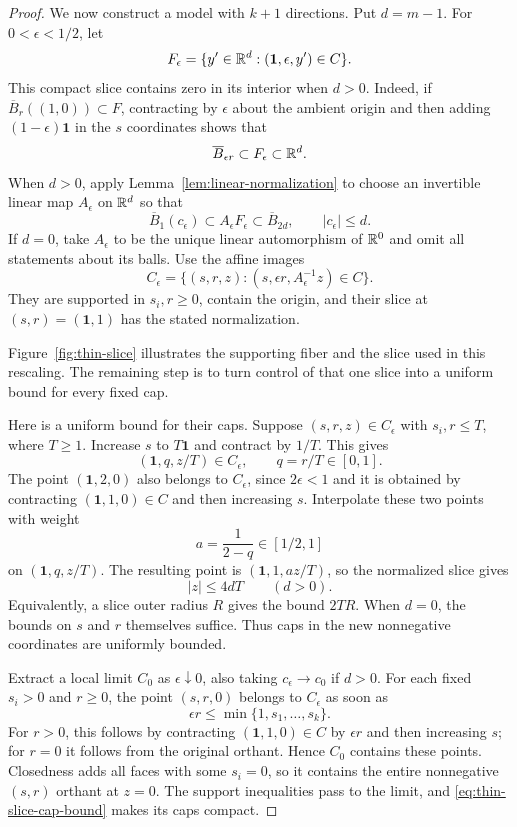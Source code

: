 \begin{proof}
We now construct a model with $k+1$ directions.  Put $d=m-1$.
For $0<\epsilon<1/2$, let
\[
 F_\epsilon=
 \{y'\in\mathbb R^d:(\mathbf1,\epsilon,y')\in C\}.
\]
This compact slice contains zero in its interior when $d>0$.
Indeed, if $\overline B_r((1,0))\subset F$, contracting by
$\epsilon$ about the ambient origin and then adding
$(1-\epsilon)\mathbf1$ in the $s$ coordinates shows that
\[
 \overline B_{\epsilon r}\subset F_\epsilon\subset\mathbb R^d.
\]
When $d>0$, apply Lemma~\ref{lem:linear-normalization} to choose an invertible
linear map $A_\epsilon$ on $\mathbb R^d$ so that
\[
 \overline B_1(c_\epsilon)\subset A_\epsilon F_\epsilon
 \subset\overline B_{2d},\qquad |c_\epsilon|\le d.
\]
If $d=0$, take $A_\epsilon$ to be the unique linear automorphism of
$\mathbb R^0$ and omit all statements about its balls.
Use the affine images
\[
 C_\epsilon=
 \{(s,r,z):(s,\epsilon r,A_\epsilon^{-1}z)\in C\}.
\]
They are supported in $s_i,r\ge0$, contain the origin, and their
slice at $(s,r)=(\mathbf1,1)$ has the stated normalization.

Figure~\ref{fig:thin-slice} illustrates the supporting fiber and the
slice used in this rescaling. The remaining step is to turn control of
that one slice into a uniform bound for every fixed cap.


Here is a uniform bound for their caps.  Suppose
$(s,r,z)\in C_\epsilon$ with $s_i,r\le T$, where $T\ge1$.
Increase $s$ to $T\mathbf1$ and contract by $1/T$.  This gives
\[
 (\mathbf1,q,z/T)\in C_\epsilon,
 \qquad q=r/T\in[0,1].
\]
The point $(\mathbf1,2,0)$ also belongs to $C_\epsilon$, since
$2\epsilon<1$ and it is obtained by contracting
$(\mathbf1,1,0)\in C$ and then increasing $s$.
Interpolate these two points with weight
\[
 a=\frac1{2-q}\in[1/2,1]
\]
on $(\mathbf1,q,z/T)$.  The resulting point is
$(\mathbf1,1,az/T)$, so the normalized slice gives
\begin{equation}\label{eq:thin-slice-cap-bound}
 |z|\le 4dT\qquad(d>0).
\end{equation}
Equivalently, a slice outer radius $R$ gives the bound $2TR$.
When $d=0$, the bounds on $s$ and $r$ themselves suffice.
Thus caps in the new nonnegative coordinates are uniformly bounded.

Extract a local limit $C_0$ as $\epsilon\downarrow0$, also taking
$c_\epsilon\to c_0$ if $d>0$.  For each fixed $s_i>0$ and $r\ge0$,
the point $(s,r,0)$ belongs to $C_\epsilon$ as soon as
\[
 \epsilon r\le\min\{1,s_1,\ldots,s_k\}.
\]
For $r>0$, this follows by contracting $(\mathbf1,1,0)\in C$
by $\epsilon r$ and then increasing $s$; for $r=0$ it follows
from the original orthant.  Hence $C_0$ contains these points.
Closedness adds all faces with some $s_i=0$, so it contains the
entire nonnegative $(s,r)$ orthant at $z=0$.  The support inequalities
pass to the limit, and \eqref{eq:thin-slice-cap-bound} makes its caps
compact.


\end{proof}
